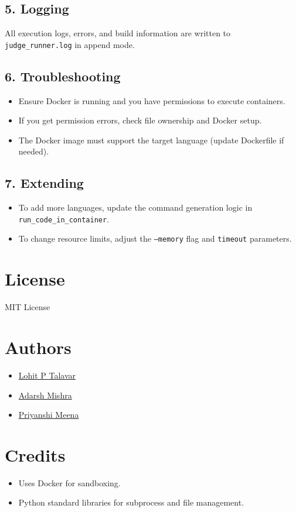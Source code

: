 \documentclass{article}
\begin{document}
\subsection*{5. Logging}
All execution logs, errors, and build information are written to \texttt{judge\_runner.log} in append mode.

\subsection*{6. Troubleshooting}
\begin{itemize}
    \item Ensure Docker is running and you have permissions to execute containers.
    \item If you get permission errors, check file ownership and Docker setup.
    \item The Docker image must support the target language (update Dockerfile if needed).
\end{itemize}

\subsection*{7. Extending}
\begin{itemize}
    \item To add more languages, update the command generation logic in \texttt{run\_code\_in\_container}.
    \item To change resource limits, adjust the \texttt{--memory} flag and \texttt{timeout} parameters.
\end{itemize}

\section*{License}
MIT License

\section*{Authors}
\begin{itemize}
    \item \href{https://github.com/lohitpt252003}{Lohit P Talavar}
    \item \href{https://github.com/adarshmishra121}{Adarsh Mishra}
    \item \href{https://github.com/MeenaPriyanshi}{Priyanshi Meena}
\end{itemize}

\section*{Credits}
\begin{itemize}
    \item Uses Docker for sandboxing.
    \item Python standard libraries for subprocess and file management.
\end{itemize}
\end{document}
